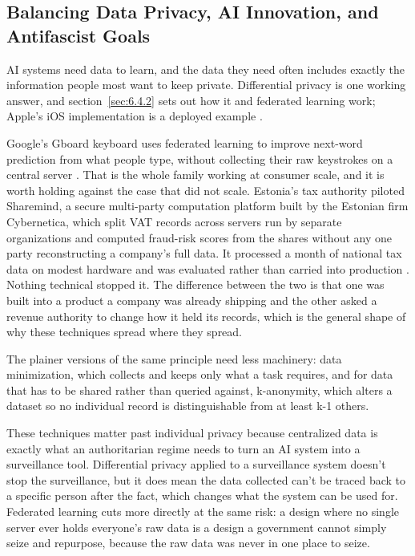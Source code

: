 \subsection{Balancing Data Privacy, AI Innovation, and Antifascist Goals}
\label{sec:9.2.1}
AI systems need data to learn, and the data they need often includes exactly the information people most want to keep private. Differential privacy is one working answer, and section~\ref{sec:6.4.2} sets out how it and federated learning work; Apple's iOS implementation is a deployed example \autocite{apple2017privacy}.

Google's Gboard keyboard uses federated learning to improve next-word prediction from what people type, without collecting their raw keystrokes on a central server \autocite{hard2018federated}. That is the whole family working at consumer scale, and it is worth holding against the case that did not scale. Estonia's tax authority piloted Sharemind, a secure multi-party computation platform built by the Estonian firm Cybernetica, which split VAT records across servers run by separate organizations and computed fraud-risk scores from the shares without any one party reconstructing a company's full data. It processed a month of national tax data on modest hardware and was evaluated rather than carried into production \autocite{bogdanov2015taxfraud}. Nothing technical stopped it. The difference between the two is that one was built into a product a company was already shipping and the other asked a revenue authority to change how it held its records, which is the general shape of why these techniques spread where they spread.

The plainer versions of the same principle need less machinery: data minimization, which collects and keeps only what a task requires, and for data that has to be shared rather than queried against, k-anonymity, which alters a dataset so no individual record is distinguishable from at least k-1 others.

These techniques matter past individual privacy because centralized data is exactly what an authoritarian regime needs to turn an AI system into a surveillance tool. Differential privacy applied to a surveillance system doesn't stop the surveillance, but it does mean the data collected can't be traced back to a specific person after the fact, which changes what the system can be used for. Federated learning cuts more directly at the same risk: a design where no single server ever holds everyone's raw data is a design a government cannot simply seize and repurpose, because the raw data was never in one place to seize.
